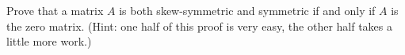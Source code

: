 Prove that a matrix $A$ is both skew-symmetric and symmetric if and only if $A$ is the zero matrix.  (Hint: one half of this proof is very easy, the other half takes a little more work.)